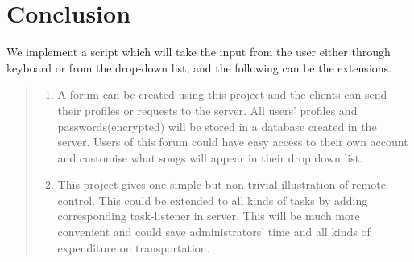 \section*{Conclusion}
We implement a script which will take the input from the user either through keyboard or from the drop-down list, and the following can be the extensions. 
\begin{quote}
\begin{enumerate}
\item
A forum can be created using this project and the clients can send their profiles or requests to the server. All users' profiles and passwords(encrypted) will be stored in a database created in the server. Users of this forum could have easy access to their own account and customise what songs will appear in their drop down list.
\item
This project gives one simple but non-trivial illustration of remote control. This could be extended to all kinds of tasks by adding corresponding task-listener in server. This will be much more convenient and could save administrators' time and all kinds of expenditure on transportation.
\end{enumerate}
\end{quote}
